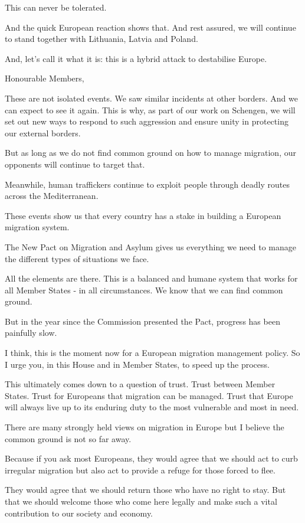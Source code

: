 \documentclass[a4paper,11pt]{article}
\begin{document}
This can never be tolerated.

And the quick European reaction shows that. And rest assured, we will continue to stand together with Lithuania, Latvia and Poland.

And, let's call it what it is: this is a hybrid attack to destabilise Europe.

 

Honourable Members,

These are not isolated events. We saw similar incidents at other borders. And we can expect to see it again. This is why, as part of our work on Schengen, we will set out new ways to respond to such aggression and ensure unity in protecting our external borders. 

But as long as we do not find common ground on how to manage migration, our opponents will continue to target that.

Meanwhile, human traffickers continue to exploit people through deadly routes across the Mediterranean.

These events show us that every country has a stake in building a European migration system.

The New Pact on Migration and Asylum gives us everything we need to manage the different types of situations we face.

All the elements are there. This is a balanced and humane system that works for all Member States - in all circumstances. We know that we can find common ground.

But in the year since the Commission presented the Pact, progress has been painfully slow.

I think, this is the moment now for a European migration management policy. So I urge you, in this House and in Member States, to speed up the process.

This ultimately comes down to a question of trust. Trust between Member States. Trust for Europeans that migration can be managed. Trust that Europe will always live up to its enduring duty to the most vulnerable and most in need.

There are many strongly held views on migration in Europe but I believe the common ground is not so far away.

Because if you ask most Europeans, they would agree that we should act to curb irregular migration but also act to provide a refuge for those forced to flee.

They would agree that we should return those who have no right to stay. But that we should welcome those who come here legally and make such a vital contribution to our society and economy.
\end{document}
